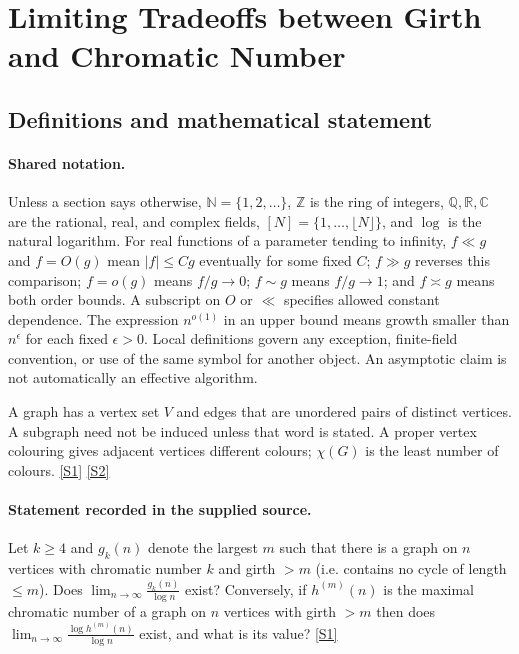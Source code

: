 \documentclass[11pt,a4paper]{article}
\newcommand{\N}{\mathbb{N}}
\newcommand{\Z}{\mathbb{Z}}
\newcommand{\Q}{\mathbb{Q}}
\newcommand{\R}{\mathbb{R}}
\newcommand{\C}{\mathbb{C}}
\newcommand{\sref}[2]{\hyperlink{source:#1:#2}{[S#2]}}
\begin{document}
\section{Limiting Tradeoffs between Girth and Chromatic Number}\label{statement}


\subsection{Definitions and mathematical statement}

\paragraph{Shared notation.}Unless a section says otherwise, $\N=\{1,2,\ldots\}$,
$\Z$ is the ring of integers, $\Q,\R,\C$ are the rational, real, and complex
fields, $[N]=\{1,\ldots,\lfloor N\rfloor\}$, and $\log$ is the natural
logarithm. For real functions of a parameter tending to infinity,
$f\ll g$ and $f=O(g)$ mean $|f|\leq Cg$ eventually for some fixed $C$;
$f\gg g$ reverses this comparison; $f=o(g)$ means $f/g\to0$;
$f\sim g$ means $f/g\to1$; and $f\asymp g$ means both order bounds.
A subscript on $O$ or $\ll$ specifies allowed constant dependence.
The expression $n^{o(1)}$ in an upper bound means growth smaller than
$n^\epsilon$ for each fixed $\epsilon>0$. Local definitions govern any
exception, finite-field convention, or use of the same symbol for another
object. An asymptotic claim is not automatically an effective algorithm.



A graph has a vertex set $V$ and edges that are unordered pairs of distinct vertices. A subgraph need not be induced unless that word is stated. A proper vertex colouring gives adjacent vertices different colours; $\chi(G)$ is the least number of colours. \sref{statement}{1} \sref{statement}{2}

\paragraph{Statement recorded in the supplied source.}
Let $k\geq 4$ and $g_k(n)$ denote the largest $m$ such that there is a graph on $n$ vertices with chromatic number $k$ and girth $>m$ (i.e. contains no cycle of length $\leq m$). Does $ \lim_{n\to \infty}\frac{g_k(n)}{\log n} $ exist?
Conversely, if $h^{(m)}(n)$ is the maximal chromatic number of a graph on $n$ vertices with girth $>m$ then does $ \lim_{n\to \infty}\frac{\log h^{(m)}(n)}{\log n} $ exist, and what is its value? \sref{statement}{1}
\end{document}
